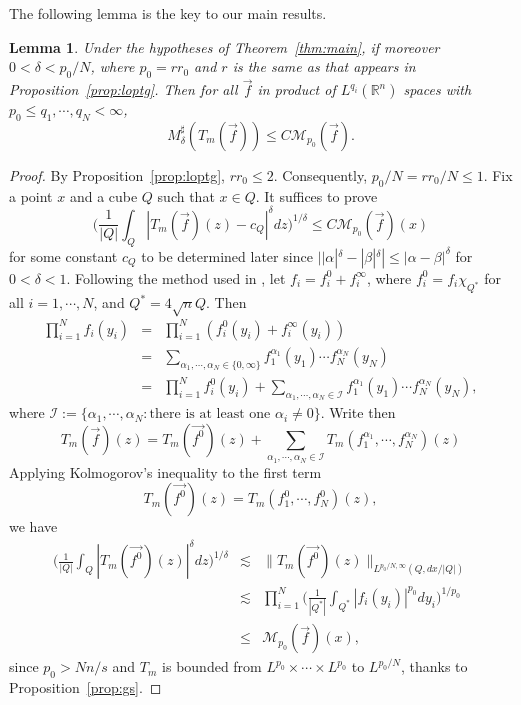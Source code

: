 \documentclass[11pt,oneside,onecolumn]{amsart}
\numberwithin{equation}{section}
\newtheorem{Lemma}[Theorem]{Lemma}
\begin{document}
The following lemma is the key to our main results.

\begin{Lemma}\label{lm:main}
Under the hypotheses of Theorem~\ref{thm:main}, if moreover $0<\delta<p_0/N$, where $p_0=rr_0$ and $r$ is the same as that appears in Proposition~\ref{prop:loptg}. Then for all $\vec{f}$ in product
of $L^{q_i}({\mathbb{R}}^n)$ spaces with $p_0\le q_1,\cdots, q_N<\infty$,
\begin{equation}\label{eq:e5}
M_\delta^\sharp(T_m(\vec{f}))\le C\mathcal{M}_{p_0}(\vec{f}).
\end{equation}
\end{Lemma}
\begin{proof}
By Proposition~\ref{prop:loptg}, $rr_0\le 2$. Consequently, $p_0/N = rr_0/N\le 1$.
Fix a point $x$ and a cube $Q$ such that $x\in Q$. It suffices to prove
\begin{equation}\label{eq:e6}
\bigg( \frac{1}{|Q|}\int_Q |T_m(\vec{f})(z)-c_Q|^\delta dz\bigg)^{1/\delta}\le C\mathcal{M}_{p_0}(\vec{f})(x)
\end{equation}
for some constant $c_Q$ to be determined later
since $||\alpha|^\delta-|\beta|^\delta|\le |\alpha-\beta|^\delta$ for $0<\delta<1$.
Following the method used in \cite{LOPTG}, let $f_i=f_i^0+f_i^\infty$, where $f_i^0=f_i\chi^{}_{Q^*}$ for all
$i=1,\cdots,N$, and $Q^*=4\sqrt{n}Q$. Then
\begin{eqnarray*}
\prod_{i=1}^Nf_i(y_i)&=&\prod_{i=1}^N(f_i^0(y_i)+f_i^\infty(y_i))\\
&=&\sum_{\alpha_1,\cdots,\alpha_N\in\{0,\infty\}}f_1^{\alpha_1}(y_1)\cdots f_N^{\alpha_N}(y_N)\\
&=&\prod_{i=1}^N f_i^0(y_i)+\sum_{\alpha_1,\cdots,\alpha_N\in \mathcal{I}} f_1^{\alpha_1}(y_1)\cdots f_N^{\alpha_N}(y_N),
\end{eqnarray*}
where $\mathcal{I}:=\{\alpha_1,\cdots,\alpha_N: \mbox{there is at least one $\alpha_i\neq 0$}\}$.
Write then
\begin{equation}\label{eq:e7}
T_m(\vec{f})(z)=T_m(\vec{f^0})(z)+\sum_{\alpha_1,\cdots,\alpha_N\in\mathcal{I}}
T_m(f_1^{\alpha_1},\cdots,f_N^{\alpha_N})(z)
\end{equation}
Applying  Kolmogorov's inequality to the first term
\[
  T_m(\vec{f^0})(z)=T_m(f_1^0,\cdots,f_N^0)(z),
\]
we have
\begin{eqnarray*}
\bigg(\frac{1}{|Q|}\int_Q |T_m(\vec{f^0})(z)|^\delta dz\bigg)^{1/\delta}
&\lesssim& \|T_m(\vec{f^0})(z)\|_{L^{p_0/N,\infty}(Q,dx/{|Q|})}\\
&\lesssim& \prod_{i=1}^N\bigg(\frac{1}{|Q^*|}\int_{Q^*}|f_i(y_i)|^{p_0}dy_i\bigg)^{1/{p_0}}\\
&\le& \mathcal{M}_{p_0}(\vec{f})(x),
\end{eqnarray*}
since $p_0>Nn/s$ and $T_m$ is bounded from $L^{p_0}\times \cdots\times L^{p_0}$ to $L^{p_0/N}$, thanks to Proposition~\ref{prop:gs}.


\end{proof}
\end{document}
